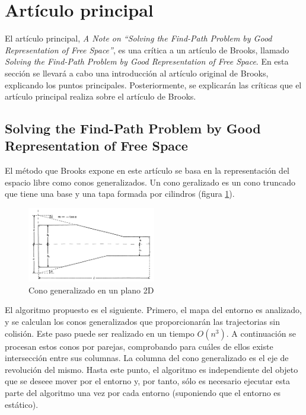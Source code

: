 \section{Artículo principal}
\label{articulo_principal}


El artículo principal, \textit{A Note on ``Solving the Find-Path Problem by Good Representation of Free Space''}, es una crítica a un artículo de Brooks, llamado \textit{Solving the Find-Path Problem by Good Representation of Free Space}. En esta sección se llevará a cabo una introducción al artículo original de Brooks, explicando los puntos principales. Posteriormente, se explicarán las críticas que el artículo principal realiza sobre el artículo de Brooks.

\subsection{Solving the Find-Path Problem by Good Representation of Free Space}

El método que Brooks expone en este artículo se basa en la representación del espacio libre como conos generalizados. Un cono geralizado es un cono truncado que tiene una base y una tapa formada por cilindros (figura \ref{fig:cono_generalizado}).\\

\begin{figure}[h]
		\centering
        \includegraphics[width=0.5\textwidth]{images/cono_gen.png}
        \caption{Cono generalizado en un plano 2D}
        \label{fig:cono_generalizado}
\end{figure} 

El algoritmo propuesto es el siguiente. Primero, el mapa del entorno es analizado, y se calculan los conos generalizados que proporcionarán las trajectorias sin colisión. Este paso puede ser realizado en un tiempo $O(n^3)$. A continuación se procesan estos conos por parejas, comprobando para cuáles de ellos existe intersección entre sus columnas. La columna del cono generalizado es el eje de revolución del mismo. Hasta este punto, el algoritmo es independiente del objeto que se deseee mover por el entorno y, por tanto, sólo es necesario ejecutar esta parte del algoritmo una vez por cada entorno (suponiendo que el entorno es estático).\\

